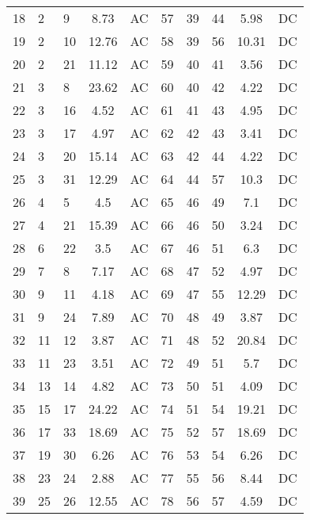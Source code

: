 \documentclass[a4paper,fleqn]{cas-dc}
\begin{document}
\begin{table}[htbp]
{\begin{tabularx}{\columnwidth}{YYYcY|YYYcY}
    18    & 2     & 9     & 8.73  & AC    & 57    & 39    & 44    & 5.98  & DC \\
    19    & 2     & 10    & 12.76 & AC    & 58    & 39    & 56    & 10.31 & DC \\
    20    & 2     & 21    & 11.12 & AC    & 59    & 40    & 41    & 3.56  & DC \\
    21    & 3     & 8     & 23.62 & AC    & 60    & 40    & 42    & 4.22  & DC \\
    22    & 3     & 16    & 4.52  & AC    & 61    & 41    & 43    & 4.95  & DC \\
    23    & 3     & 17    & 4.97  & AC    & 62    & 42    & 43    & 3.41  & DC \\
    24    & 3     & 20    & 15.14 & AC    & 63    & 42    & 44    & 4.22  & DC \\
    25    & 3     & 31    & 12.29 & AC    & 64    & 44    & 57    & 10.3  & DC \\
    26    & 4     & 5     & 4.5   & AC    & 65    & 46    & 49    & 7.1   & DC \\
    27    & 4     & 21    & 15.39 & AC    & 66    & 46    & 50    & 3.24  & DC \\
    28    & 6     & 22    & 3.5   & AC    & 67    & 46    & 51    & 6.3   & DC \\
    29    & 7     & 8     & 7.17  & AC    & 68    & 47    & 52    & 4.97  & DC \\
    30    & 9     & 11    & 4.18  & AC    & 69    & 47    & 55    & 12.29 & DC \\
    31    & 9     & 24    & 7.89  & AC    & 70    & 48    & 49    & 3.87  & DC \\
    32    & 11    & 12    & 3.87  & AC    & 71    & 48    & 52    & 20.84 & DC \\
    33    & 11    & 23    & 3.51  & AC    & 72    & 49    & 51    & 5.7   & DC \\
    34    & 13    & 14    & 4.82  & AC    & 73    & 50    & 51    & 4.09  & DC \\
    35    & 15    & 17    & 24.22 & AC    & 74    & 51    & 54    & 19.21 & DC \\
    36    & 17    & 33    & 18.69 & AC    & 75    & 52    & 57    & 18.69 & DC \\
    37    & 19    & 30    & 6.26  & AC    & 76    & 53    & 54    & 6.26  & DC \\
    38    & 23    & 24    & 2.88  & AC    & 77    & 55    & 56    & 8.44  & DC \\
    39    & 25    & 26    & 12.55 & AC    & 78    & 56    & 57    & 4.59  & DC \\
    \hline
    \end{tabularx}
    \label{tab_line}
    }
\end{table}
  
\end{document}
